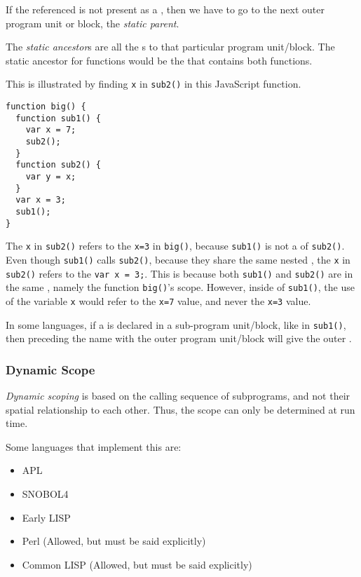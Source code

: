\begin{definition}\label{def:Variable_Static_Parent}
  If the  referenced is not present as a , then we have to go to the next outer program unit or block, the \emph{static parent}.
\end{definition}

\begin{definition}\label{def:Variable_Static_Ancestor}
  The \emph{static ancestor}s are all the s to that particular program unit/block.
  The static ancestor for functions would be the  that contains both functions.
\end{definition}

This is illustrated by finding \texttt{x} in \texttt{sub2()} in this JavaScript function.
\begin{verbatim}
function big() {
  function sub1() {
    var x = 7;
    sub2();
  }
  function sub2() {
    var y = x;
  }
  var x = 3;
  sub1();
}
\end{verbatim}
The \texttt{x} in \texttt{sub2()} refers to the \texttt{x=3} in \texttt{big()}, because \texttt{sub1()} is not a  of \texttt{sub2()}.
Even though \texttt{sub1()} calls \texttt{sub2()}, because they share the same nested , the \texttt{x} in \texttt{sub2()} refers to the \texttt{var x = 3;}.
This is because both \texttt{sub1()} and \texttt{sub2()} are in the same , namely the function \texttt{big()}'s scope.
However, inside of \texttt{sub1()}, the use of the variable \texttt{x} would refer to the \texttt{x=7} value, and never the \texttt{x=3} value.

In some languages, if a  is declared in a sub-program unit/block, like in \texttt{sub1()}, then preceding the  name with the outer program unit/block will give the outer  .

\subsubsection{Dynamic Scope}\label{subsubsec:Dynamic_Scope}
\begin{definition}\label{def:Dynamic_Scoping}
  \emph{Dynamic scoping} is based on the calling sequence of subprograms, and not their spatial relationship to each other.
  Thus, the scope can only be determined at run time.

  Some languages that implement this are:
  \begin{itemize}[noitemsep]
  \item APL
  \item SNOBOL4
  \item Early LISP
  \item Perl (Allowed, but must be said explicitly)
  \item Common LISP (Allowed, but must be said explicitly)
  \end{itemize}
\end{definition}

